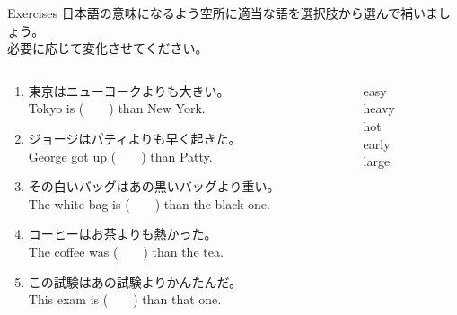\documentclass[aspectratio=169,xcolor={dvipsnames,table}]{beamer}
\begin{document}
\begin{frame}[plain]{Exercises}
 日本語の意味になるよう空所に適当な語を選択肢から選んで補いましょう。\\必要に応じて変化させてください。

\begin{columns}[t]
 \begin{column}{.78\textwidth}
   \begin{enumerate}
  \item 東京はニューヨークよりも大きい。\\
	Tokyo is (~~~~) than New York. 
    \item ジョージはパティよりも早く起きた。\\
	George got up (~~~~) than Patty. 
    \item その白いバッグはあの黒いバッグより重い。\\
	The white bag is (~~~~) than the black one. 
    \item コーヒーはお茶よりも熱かった。\\
	The coffee was (~~~~) than the tea. 
    \item この試験はあの試験よりかんたんだ。\\
	This exam  is (~~~~) than that one. 



 \end{enumerate}
 \end{column}
\begin{column}{.2\textwidth}
 \begin{tcolorbox}
  easy\\
  heavy\\
  hot\\
  early\\
  large
 \end{tcolorbox}
\end{column}
\end{columns}
\end{frame}
\end{document}

